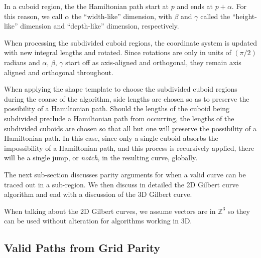 In a cuboid region, the the Hamiltonian path start at $p$ and ends at $p + \alpha$.
For this reason, we call $\alpha$ the ``width-like'' dimension, with $\beta$ and $\gamma$
called the ``height-like'' dimension and ``depth-like'' dimension, respectively.

When processing the subdivided cuboid regions, the coordinate system is updated
with new integral lengths and rotated.
Since rotations are only in units of $(\pi/2)$ radians and $\alpha$, $\beta$, $\gamma$ start
off as axis-aligned and orthogonal, they remain axis aligned and orthogonal throughout.

When applying the shape template to choose the subdivided cuboid regions during the coarse of the
algorithm, side lengths are chosen so as to preserve the possibility of a Hamiltonian path.
Should the lengths of the cuboid being subdivided preclude a Hamiltonian path from occurring, the lengths
of the subdivided cuboids are chosen
so that all but one will preserve the possibility of a Hamiltonian path.
In this case, since only a single cuboid absorbs the impossibility of a Hamiltonian path,
and this process is recursively applied, there will be a single jump, or \textit{notch},
in the resulting curve, globally.


The next sub-section discusses parity arguments for when a valid curve can be
traced out in a sub-region.
We then discuss in detailed the 2D Gilbert curve algorithm and end with a discussion of the 3D Gilbert curve.

When talking about the 2D Gilbert curves, we assume vectors are in $\mathbb{Z}^3$
so they can be used without alteration for algorithms working in 3D.


\subsection{Valid Paths from Grid Parity}

